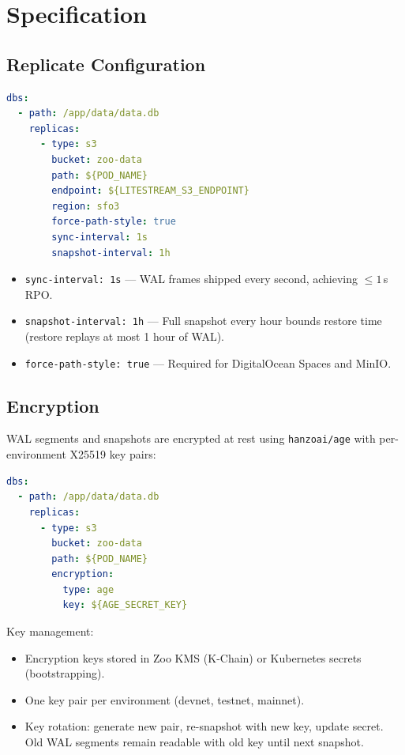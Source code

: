 \section{Specification}


\subsection{Replicate Configuration}

\begin{lstlisting}[language=yaml,caption={replicate-config ConfigMap}]
dbs:
  - path: /app/data/data.db
    replicas:
      - type: s3
        bucket: zoo-data
        path: ${POD_NAME}
        endpoint: ${LITESTREAM_S3_ENDPOINT}
        region: sfo3
        force-path-style: true
        sync-interval: 1s
        snapshot-interval: 1h
\end{lstlisting}

\begin{itemize}
\item \texttt{sync-interval: 1s} --- WAL frames shipped every
  second, achieving $\leq 1$\,s RPO.
\item \texttt{snapshot-interval: 1h} --- Full snapshot every hour
  bounds restore time (restore replays at most 1 hour of WAL).
\item \texttt{force-path-style: true} --- Required for
  DigitalOcean Spaces and MinIO.
\end{itemize}

\subsection{Encryption}

WAL segments and snapshots are encrypted at rest using
\texttt{hanzoai/age} with per-environment X25519 key pairs:

\begin{lstlisting}[language=yaml,caption={Encryption configuration}]
dbs:
  - path: /app/data/data.db
    replicas:
      - type: s3
        bucket: zoo-data
        path: ${POD_NAME}
        encryption:
          type: age
          key: ${AGE_SECRET_KEY}
\end{lstlisting}

Key management:
\begin{itemize}
\item Encryption keys stored in Zoo KMS (K-Chain) or
  Kubernetes secrets (bootstrapping).
\item One key pair per environment (devnet, testnet, mainnet).
\item Key rotation: generate new pair, re-snapshot with new key,
  update secret.  Old WAL segments remain readable with old key
  until next snapshot.
\end{itemize}

